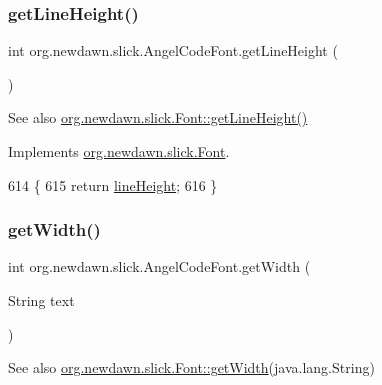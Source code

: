 \subsubsection{\texorpdfstring{get\+Line\+Height()}{getLineHeight()}}
{\footnotesize\ttfamily int org.\+newdawn.\+slick.\+Angel\+Code\+Font.\+get\+Line\+Height (\begin{DoxyParamCaption}{ }\end{DoxyParamCaption})\hspace{0.3cm}{\ttfamily [inline]}}

\begin{DoxySeeAlso}{See also}
\mbox{\hyperlink{interfaceorg_1_1newdawn_1_1slick_1_1_font_aeb4b7770f47c5e2631d84b35924376d7}{org.\+newdawn.\+slick.\+Font\+::get\+Line\+Height()}} 
\end{DoxySeeAlso}


Implements \mbox{\hyperlink{interfaceorg_1_1newdawn_1_1slick_1_1_font_aeb4b7770f47c5e2631d84b35924376d7}{org.\+newdawn.\+slick.\+Font}}.


\begin{DoxyCode}
614                                \{
615         \textcolor{keywordflow}{return} \mbox{\hyperlink{classorg_1_1newdawn_1_1slick_1_1_angel_code_font_a79b1b71568fb19eaed6dea5babc6e752}{lineHeight}};
616     \}
\end{DoxyCode}
\mbox{\label{classorg_1_1newdawn_1_1slick_1_1_angel_code_font_a0202edaba33e21e6bfb3c7dbaebbbb92}} 
\subsubsection{\texorpdfstring{get\+Width()}{getWidth()}}
{\footnotesize\ttfamily int org.\+newdawn.\+slick.\+Angel\+Code\+Font.\+get\+Width (\begin{DoxyParamCaption}\item[{String}]{text }\end{DoxyParamCaption})\hspace{0.3cm}{\ttfamily [inline]}}

\begin{DoxySeeAlso}{See also}
\mbox{\hyperlink{interfaceorg_1_1newdawn_1_1slick_1_1_font_a6dbdd5828730e18fcf0612307d0394b1}{org.\+newdawn.\+slick.\+Font\+::get\+Width}}(java.\+lang.\+String) 
\end{DoxySeeAlso}


